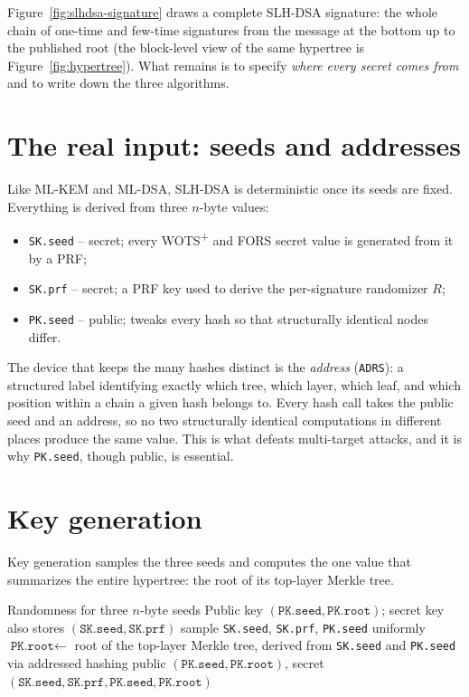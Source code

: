 Figure~\ref{fig:slhdsa-signature} draws a complete SLH-DSA signature: the whole chain of one-time and few-time signatures from the message at the bottom up to the published root (the block-level view of the same hypertree is Figure~\ref{fig:hypertree}). What remains is to specify \emph{where every secret comes from} and to write down the three algorithms.

\section{The real input: seeds and addresses}
Like ML-KEM and ML-DSA, SLH-DSA is deterministic once its seeds are fixed. Everything is derived from three $n$-byte values:

\begin{itemize}
  \item \texttt{SK.seed} -- secret; every WOTS\textsuperscript{+} and FORS secret value is generated from it by a PRF;
  \item \texttt{SK.prf} -- secret; a PRF key used to derive the per-signature randomizer $R$;
  \item \texttt{PK.seed} -- public; tweaks every hash so that structurally identical nodes differ.
\end{itemize}

The device that keeps the many hashes distinct is the \emph{address} (\texttt{ADRS}): a structured label identifying exactly which tree, which layer, which leaf, and which position within a chain a given hash belongs to. Every hash call takes the public seed and an address, so no two structurally identical computations in different places produce the same value. This is what defeats multi-target attacks, and it is why \texttt{PK.seed}, though public, is essential.

\section{Key generation}
Key generation samples the three seeds and computes the one value that summarizes the entire hypertree: the root of its top-layer Merkle tree.

\begin{algorithm}[H]
\caption{SLH-DSA.KeyGen (teaching form)}
\label{alg:slhdsa-keygen}
\begin{algorithmic}[1]
\Require Randomness for three $n$-byte seeds
\Ensure Public key $(\texttt{PK.seed},\texttt{PK.root})$; secret key also stores $(\texttt{SK.seed},\texttt{SK.prf})$
\State sample \texttt{SK.seed}, \texttt{SK.prf}, \texttt{PK.seed} uniformly
\State $\texttt{PK.root} \gets$ root of the top-layer Merkle tree, derived from \texttt{SK.seed} and \texttt{PK.seed} via addressed hashing
\State \Return public $(\texttt{PK.seed},\texttt{PK.root})$, secret $(\texttt{SK.seed},\texttt{SK.prf},\texttt{PK.seed},\texttt{PK.root})$
\end{algorithmic}
\end{algorithm}

